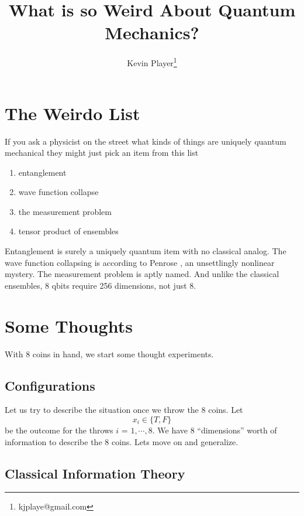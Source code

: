 \documentclass[12pt,a4paper]{article}
\begin{document}
\title{What is so Weird About Quantum Mechanics?}
\author[1]{Kevin Player\footnote{kjplaye@gmail.com}}

\maketitle


\section{The Weirdo List}
If you ask a physicist on the street what kinds of things are uniquely quantum mechanical they might just pick an item from this list

\begin{enumerate}
\item entanglement
\item wave function collapse
\item the measurement problem
\item tensor product of ensembles
\end{enumerate}

Entanglement is surely a uniquely quantum item with no classical analog.  The wave function collapsing is according to Penrose \cite{penrose}, an unsettlingly nonlinear mystery.  The measurement problem is aptly named.  And unlike the classical ensembles, 8 qbits require 256 dimensions, not just 8.

\section{Some Thoughts}
With 8 coins in hand, we start some thought experiments.
\subsection{Configurations}
Let us try to describe the situation once we throw the 8 coins.  Let
\[
x_i \in \{T,F\}
\]
be the outcome for the throws $i$ = $1,\cdots,8$.  We have 8 ``dimensions'' worth of information to describe the 8 coins.  Lets move on and generalize.
  
\subsection{Classical Information Theory}
\end{document}
